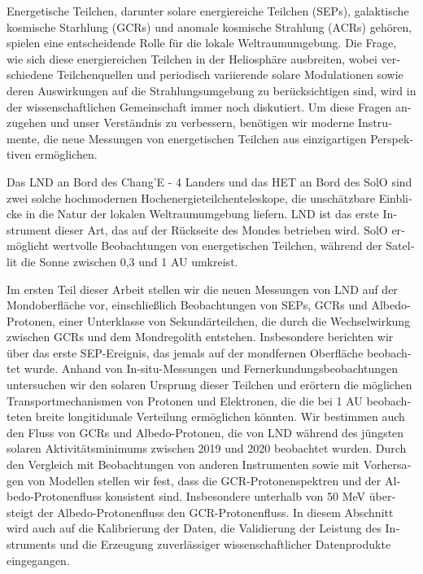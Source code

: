 \begin{otherlanguage}{ngerman}
    Energetische Teilchen, darunter solare energiereiche Teilchen (SEPs), galaktische kosmische Starhlung (GCRs) und anomale kosmische Strahlung (ACRs) gehören, spielen eine entscheidende Rolle für die lokale Weltraumumgebung. Die Frage, wie sich diese energiereichen Teilchen in der Heliosphäre ausbreiten, wobei verschiedene Teilchenquellen und periodisch variierende solare Modulationen sowie deren Auswirkungen auf die Strahlungsumgebung zu berücksichtigen sind, wird in der wissenschaftlichen Gemeinschaft immer noch diskutiert. Um diese Fragen anzugehen und unser Verständnis zu verbessern, benötigen wir moderne Instrumente, die neue Messungen von energetischen Teilchen aus einzigartigen Perspektiven ermöglichen.

    Das \ac{LND} an Bord des Chang'E - 4 Landers und das \ac{HET} an Bord des \ac{SolO} sind zwei solche hochmodernen Hochenergieteilchenteleskope, die unschätzbare Einblicke in die Natur der lokalen Weltraumumgebung liefern. \ac{LND} ist das erste Instrument dieser Art, das auf der Rückseite des Mondes betrieben wird. \ac{SolO} ermöglicht wertvolle Beobachtungen von energetischen Teilchen, w\"{a}hrend der Satellit die Sonne zwischen 0,3 und 1 AU umkreist.
    
    Im ersten Teil dieser Arbeit stellen wir die neuen Messungen von \ac{LND} auf der Mondoberfläche vor, einschließlich Beobachtungen von \acp{SEP}, \acp{GCR} und Albedo-Protonen, einer Unterklasse von Sekundärteilchen, die durch die Wechselwirkung zwischen \acp{GCR} und dem Mondregolith entstehen. Insbesondere berichten wir über das erste \ac{SEP}-Ereignis, das jemals auf der mondfernen Oberfläche beobachtet wurde. Anhand von In-situ-Messungen und Fernerkundungsbeobachtungen untersuchen wir den solaren Ursprung dieser Teilchen und erörtern die möglichen Transportmechanismen von Protonen und Elektronen, die die bei 1 AU beobachteten breite longitidunale Verteilung ermöglichen könnten. Wir bestimmen auch den Fluss von \acp{GCR} und Albedo-Protonen, die von \ac{LND} während des jüngsten solaren Aktivitätsminimums zwischen 2019 und 2020 beobachtet wurden. Durch den Vergleich mit Beobachtungen von anderen Instrumenten sowie mit Vorhersagen von Modellen stellen wir fest, dass die \ac{GCR}-Protonenspektren und der Albedo-Protonenfluss konsistent sind. Insbesondere unterhalb von 50 MeV übersteigt der Albedo-Protonenfluss den \ac{GCR}-Protonenfluss.
    In diesem Abschnitt wird auch auf die Kalibrierung der Daten, die Validierung der Leistung des Instruments und die Erzeugung zuverlässiger wissenschaftlicher Datenprodukte eingegangen.
    

\end{otherlanguage}
